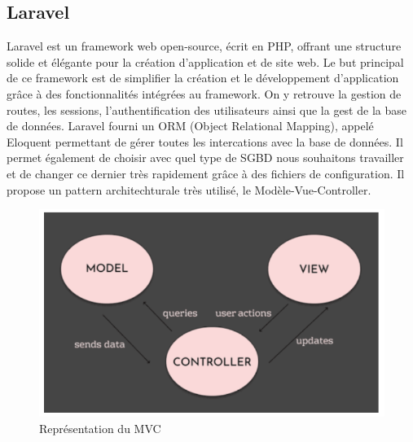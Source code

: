 \subsection{Laravel}
Laravel est un framework web open-source, écrit en PHP, offrant une structure solide et élégante pour la création d'application et de site web. Le but principal de ce framework est de simplifier la création et le développement d'application grâce à des fonctionnalités intégrées au framework. On y retrouve la gestion de routes, les sessions, l'authentification des utilisateurs ainsi que la gest de la base de données.
Laravel fourni un ORM (Object Relational Mapping), appelé Eloquent permettant de gérer toutes les intercations avec la base de données. Il permet également de choisir avec quel type de SGBD nous souhaitons travailler et de changer ce dernier très rapidement grâce à des fichiers de configuration.
Il propose un pattern architechturale très utilisé, le Modèle-Vue-Controller.
\begin{center}
    \begin{figure}[H]%
        \includegraphics[width=\textwidth]{./assets/figures/MVCExplanation.png}
        \caption{Représentation du MVC \label{MVCExplanation.png}}
    \end{figure}
\end{center}

